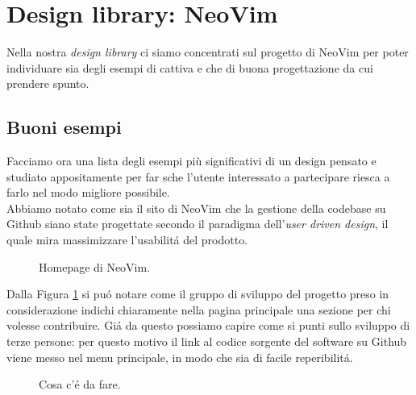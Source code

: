 \documentclass[12pt]{article} %
\begin{document}
\section{Design library: NeoVim}
Nella nostra \emph{design library} ci siamo concentrati sul progetto di NeoVim per poter individuare sia degli esempi di cattiva e che di buona progettazione da cui prendere spunto.\\
\subsection{Buoni esempi}
Facciamo ora una lista degli esempi più significativi di un design pensato e studiato appositamente per far s che l'utente interessato a partecipare riesca a farlo nel modo migliore possibile.\\
Abbiamo notato come sia il sito di NeoVim che la gestione della codebase su Github siano state progettate secondo il paradigma dell'\emph{user driven design}, il quale mira massimizzare l'usabilit\'a del prodotto.

\begin{figure}[H] 
\caption{Homepage di NeoVim.}
\label{fig:buonesempio1}
\end{figure}

Dalla Figura \ref{fig:buonesempio1} si pu\'o notare come il gruppo di sviluppo del progetto preso in considerazione indichi chiaramente nella pagina principale una sezione per chi volesse contribuire. Gi\'a da questo possiamo capire come si punti sullo sviluppo di terze persone: per questo motivo il link al codice sorgente del software su Github viene messo nel menu principale, in modo che sia di facile reperibilit\'a.

\begin{figure}[H] 
\caption{Cosa c'\'e da fare.}
\label{fig:buonesempio2}
\end{figure}
\end{document}
